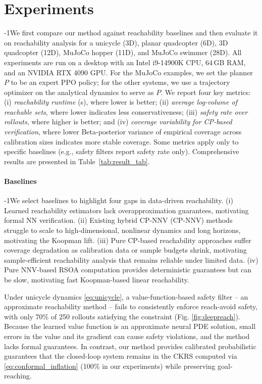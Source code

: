 
\section{Experiments}
\label{sec:experiments}
\looseness-1We first compare our method against reachability baselines and then evaluate it on reachability analysis for a unicycle (3D), planar quadcopter (6D), 3D quadcopter (12D), MuJoCo \citep{todorov2012mujoco} hopper (11D), and MuJoCo swimmer (28D). All experiments are run on a desktop with an Intel i9-14900K CPU, 64\,GB RAM, and an NVIDIA RTX 4090 GPU. For the MuJoCo examples, we set the planner $P$ to be an expert PPO \citep{schulman2017proximalpolicyoptimizationalgorithms} policy; for the other systems, we use a trajectory optimizer on the analytical dynamics to serve as $P$. We report four key metrics: (i) \textit{reachability runtime} (s), where lower is better; (ii) \textit{average log-volume of reachable sets}, where lower indicates less conservativeness; (iii) \textit{safety rate over rollouts}, where higher is better; and (iv) \textit{coverage variability for CP-based verification}, where lower Beta-posterior variance of empirical coverage across calibration sizes indicates more stable coverage. Some metrics apply only to specific baselines (e.g., safety filters report safety rate only). Comprehensive results are presented in Table~\ref{tab:result_tab}.

\paragraph{Baselines}
\looseness-1We select baselines to highlight four gaps in data-driven reachability. (i) Learned reachability estimators \citep{deepreach} lack overapproximation guarantees, motivating formal NN verification. (ii) Existing hybrid CP-NNV (CP-NNV) \citep{cp_baseline} methods struggle to scale to high-dimensional, nonlinear dynamics and long horizons, motivating the Koopman lift. (iii) Pure CP-based reachability approaches \citep{cp_survey} suffer coverage degradation as calibration data or sample budgets shrink, motivating sample-efficient reachability analysis that remains reliable under limited data. (iv) Pure NNV-based RSOA computation \citep{sage-mp} provides deterministic guarantees but can be slow, motivating fast Koopman-based linear reachability.

\noindent\textit{ } Under unicycle dynamics \eqref{eq:unicycle}, a value-function-based safety filter \citep{deepreach} -- an approximate reachability method -- fails to consistently enforce reach-avoid safety, with only 70\% of 250 rollouts satisfying the constraint (Fig. \ref{fig:deepreach}). Because the learned value function is an approximate neural PDE solution, small errors in the value and its gradient can cause safety violations, and the method lacks formal guarantees. In contrast, our method provides calibrated probabilistic guarantees that the closed-loop system remains in the CKRS computed via \eqref{eq:conformal_inflation} (100\% in our experiments) while preserving goal-reaching.

